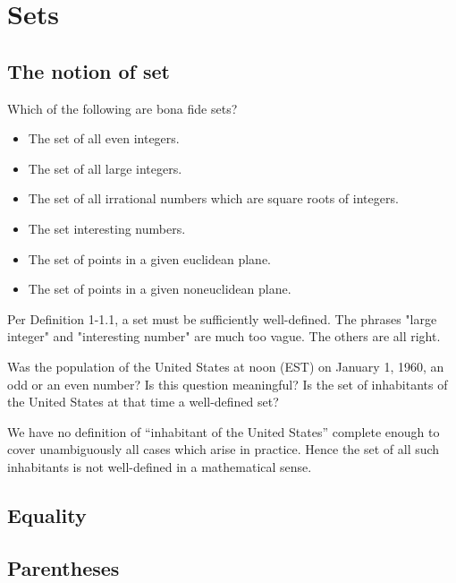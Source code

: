 \chapter{Sets}

\section{The notion of set}

\begin{exercise}
Which of the following are bona fide sets?
\begin{itemize}
    \item The set of all even integers.
    \item The set of all large integers.
    \item The set of all irrational numbers which are square roots of integers.
    \item The set interesting numbers.
    \item The set of points in a given euclidean plane.
    \item The set of points in a given noneuclidean plane.
\end{itemize}
\end{exercise}

\begin{solution}
Per Definition 1-1.1, a set must be sufficiently well-defined. 
The phrases "large integer" and "interesting number" are much too vague. The others are all right.
\end{solution}


\begin{exercise}
Was the population of the United States at noon (EST) on January 1, 1960, an odd
or an even number? Is this question meaningful? Is the set of inhabitants of the United
States at that time a well-defined set?
\end{exercise}

\begin{solution}
We have no definition of ``inhabitant of the United States'' complete enough to
cover unambiguously all cases which arise in practice. Hence the set of all such
inhabitants is not well-defined in a mathematical sense.
\end{solution}


\section{Equality}
\section{Parentheses}
